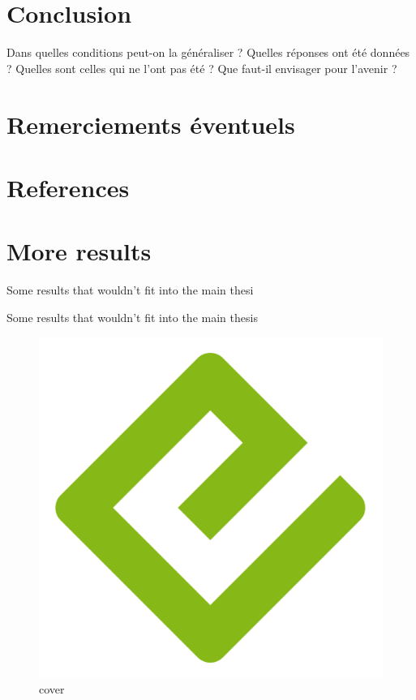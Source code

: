 \documentclass[
  a4paper,
]{scrbook}
\newlength{\cslhangindent}
\newlength{\cslentryspacingunit} %
\newenvironment{CSLReferences}[2] %
 {%
  \setlength{\parindent}{0pt}
  \ifodd #1
  \let\oldpar\par
  \def\par{\hangindent=\cslhangindent\oldpar}
  \fi
  \setlength{\parskip}{#2\cslentryspacingunit}
 }%
 {}
\begin{document}

\hypertarget{conclusion}{%
\chapter{Conclusion}\label{conclusion}}

Dans quelles conditions peut-on la généraliser ? Quelles réponses ont
été données ? Quelles sont celles qui ne l'ont pas été ? Que faut-il
envisager pour l'avenir ?


\hypertarget{remerciements-uxe9ventuels}{%
\chapter{Remerciements éventuels}\label{remerciements-uxe9ventuels}}


\hypertarget{references}{%
\chapter*{References}\label{references}}

\hypertarget{refs}{}
\begin{CSLReferences}{0}{0}
\end{CSLReferences}

\appendix
{}

\hypertarget{sec-more-results}{%
\chapter{More results}\label{sec-more-results}}

Some results that wouldn't fit into the main thesi

Some results that wouldn't fit into the main thesis

\begin{figure}

{\centering \includegraphics{./cover.png}

}

\caption{cover}

\end{figure}


\backmatter
\end{document}
